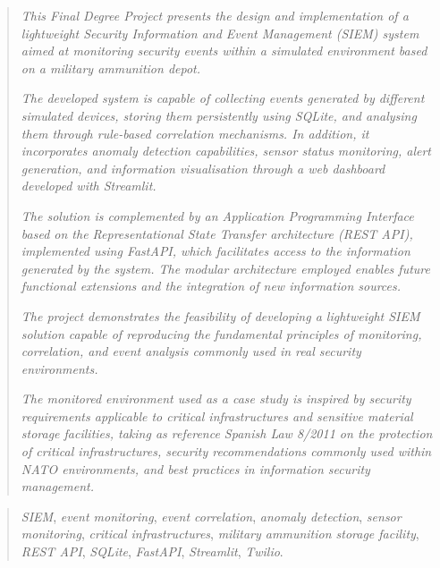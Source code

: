 \documentclass[a4paper,12pt,twoside]{memoir}
\begin{document}
\renewcommand*\abstractname{Abstract}
\begin{abstract}
\textit{This Final Degree Project presents the design and implementation of a lightweight Security Information and Event Management (SIEM) system aimed at monitoring security events within a simulated environment based on a military ammunition depot.}

\textit{The developed system is capable of collecting events generated by different simulated devices, storing them persistently using SQLite, and analysing them through rule-based correlation mechanisms. In addition, it incorporates anomaly detection capabilities, sensor status monitoring, alert generation, and information visualisation through a web dashboard developed with Streamlit.}

\textit{The solution is complemented by an Application Programming Interface based on the Representational State Transfer architecture (REST API), implemented using FastAPI, which facilitates access to the information generated by the system. The modular architecture employed enables future functional extensions and the integration of new information sources.}

\textit{The project demonstrates the feasibility of developing a lightweight SIEM solution capable of reproducing the fundamental principles of monitoring, correlation, and event analysis commonly used in real security environments.}

\textit{The monitored environment used as a case study is inspired by security requirements applicable to critical infrastructures and sensitive material storage facilities, taking as reference Spanish Law 8/2011 on the protection of critical infrastructures, security recommendations commonly used within NATO environments, and best practices in information security management.
}

\end{abstract}

\renewcommand*\abstractname{Keywords}
\begin{abstract}
\textit{SIEM}, \textit{event monitoring}, \textit{event correlation}, \textit{anomaly detection}, \textit{sensor monitoring}, \textit{critical infrastructures}, \textit{military ammunition storage facility}, \textit{REST API}, \textit{SQLite}, \textit{FastAPI}, \textit{Streamlit}, \textit{Twilio}.
\end{abstract}

\clearpage

\tableofcontents

\clearpage

\listoffigures

\clearpage

\listoftables
\clearpage

\mainmatter











\end{document}
